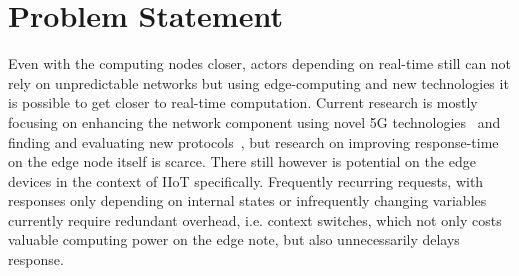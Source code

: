 \section{Problem Statement}

Even with the computing nodes closer, actors depending on real-time still can
not rely on unpredictable networks but using edge-computing and new technologies
it is possible to get closer to real-time computation. Current research is
mostly focusing on enhancing the network component using novel 5G
technologies~\cite{nunna_enabling_2015} and finding and evaluating new
protocols~\cite{suriyachai_survey_2012}, but research on improving response-time
on the edge node itself is scarce. There still however is potential on the edge
devices in the context of IIoT specifically. Frequently recurring requests, with
responses only depending on internal states or infrequently changing variables
currently require redundant overhead, i.e. context switches, which not only
costs valuable computing power on the edge note, but also unnecessarily delays
response.





